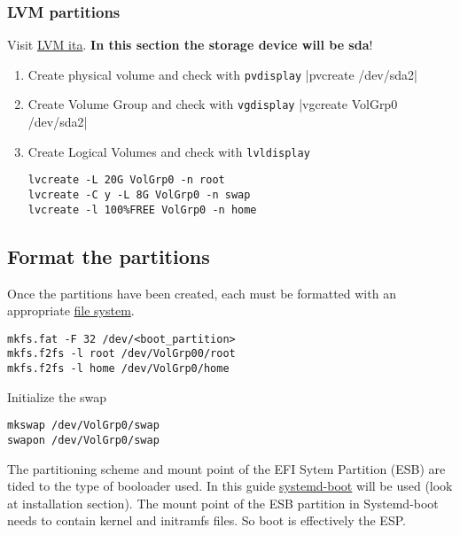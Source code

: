 \documentclass[11pt,A4]{article}
\newcommand{\linecode}[1]{ \mint[fontsize=\small,bgcolor=ArchCode,frame=single]{bash}|#1|}
\begin{document}
\subsubsection{LVM partitions}
Visit \href{https://wiki.archlinux.org/index.php/LVM_(Italiano)}{LVM ita}. \textbf{In this section the storage device will be sda}!
\begin{enumerate}
    \item Create physical volume and check with \texttt{pvdisplay}
    \vspace{-2mm}\linecode{pvcreate /dev/sda2} \vspace{-10mm}
    \item Create Volume Group and check with \texttt{vgdisplay}
    \vspace{-2mm}\linecode{vgcreate VolGrp0 /dev/sda2}\vspace{-10mm}
    \item Create Logical Volumes and check with \texttt{lvldisplay} 
    \vspace{-2mm}
    \begin{verbatim}
lvcreate -L 20G VolGrp0 -n root
lvcreate -C y -L 8G VolGrp0 -n swap
lvcreate -l 100%FREE VolGrp0 -n home
    \end{verbatim}
\end{enumerate}

\vspace{-5mm}
\subsection{Format the partitions}
Once the partitions have been created, each must be formatted with an appropriate \href{https://wiki.archlinux.org/index.php/File_system}{file system}.

\begin{verbatim}
mkfs.fat -F 32 /dev/<boot_partition> 
mkfs.f2fs -l root /dev/VolGrp00/root
mkfs.f2fs -l home /dev/VolGrp0/home
\end{verbatim}
Initialize the swap
\begin{verbatim}
mkswap /dev/VolGrp0/swap
swapon /dev/VolGrp0/swap
\end{verbatim}
\begin{tcolorbox}[boxrule=0.2mm]
The partitioning scheme and mount point of the EFI Sytem Partition (ESB) are tided to the type of booloader used. In this guide \href{https://wiki.archlinux.org/index.php/Systemd-boot}{systemd-boot} will be used (look at installation section).
The mount point of the ESB partition in Systemd-boot needs to contain kernel and initramfs files. So boot is effectively the ESP. 
\end{tcolorbox}
\end{document}
